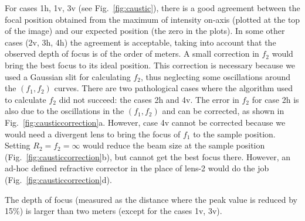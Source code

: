 \documentclass{iucr}              %
\begin{document}
For cases 1h, 1v, 3v (see  Fig.~\ref{fig:caustic}), there is a good agreement between the focal position obtained from the maximum of intensity on-axis (plotted at the top of the image) and our expected position (the zero in the plots). In some other cases (2v, 3h, 4h) the agreement is acceptable, taking into account that the observed depth of focus is of the order of meters. A small correction in $f_2$ would bring the best focus to its ideal position. This correction is necessary because we used a Gaussian slit for calculating $f_2$, thus neglecting some oscillations around the $(f_1,f_2)$ curves. There are two pathological cases where the algorithm used to calculate $f_2$ did not succeed: the cases 2h and 4v.
The error in $f_2$  for case 2h is also due to the oscillations in the $(f_1,f_2)$ and can be corrected, as shown in Fig.~\ref{fig:causticcorrection}a. However, case 4v cannot be corrected because we would need a divergent lens to bring the focus of $f_1$ to the sample position. Setting $R_2=f_2=\infty$ would reduce the beam size at the sample position (Fig.~\ref{fig:causticcorrection}b), but cannot get the best focus there. However, an ad-hoc defined refractive corrector in the place of lens-2 would do the job (Fig.~\ref{fig:causticcorrection}d).  

The depth of focus (measured as the distance where the peak value is reduced by 15\%) is larger than two meters (except for the cases 1v, 3v). 
\end{document}
